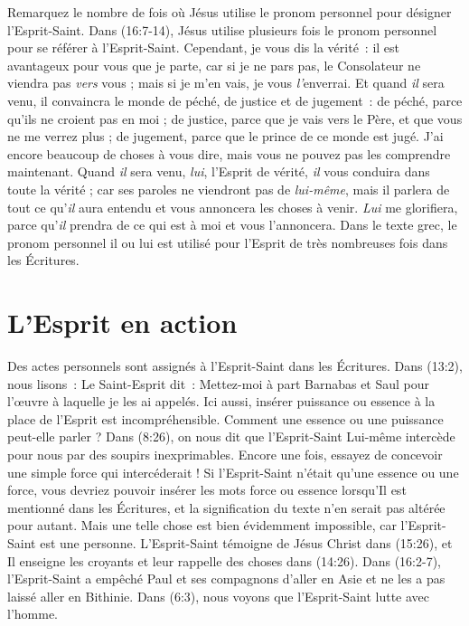 Remarquez le nombre de fois où Jésus utilise le pronom personnel pour
 désigner l'Esprit-Saint. Dans (16:7-14), Jésus utilise
 plusieurs fois le pronom personnel pour se référer à l'Esprit-Saint.
 \og Cependant, je vous dis la vérité~: il est avantageux pour vous
 que je parte, car si je ne pars pas, le Consolateur ne viendra pas
 \emph{vers} vous ; mais si je m'en vais, je vous \emph{l'}enverrai.
 Et quand \emph{il} sera venu, il convaincra le monde de péché,
 de justice et de jugement~: de péché, parce qu'ils ne croient pas en moi ;
 de justice, parce que je vais vers le Père, et que vous ne me verrez plus ;
 de jugement, parce que le prince de ce monde est jugé.
 J'ai encore beaucoup de choses à vous dire, mais vous ne pouvez pas
 les comprendre maintenant. Quand \emph{il} sera venu, \emph{lui},
 l'Esprit de vérité, \emph{il} vous conduira dans toute la vérité ;
 car ses paroles ne viendront pas de \emph{lui-même}, mais il parlera de
 tout ce qu'\emph{il} aura entendu et vous annoncera les choses à venir.
 \emph{Lui} me glorifiera, parce qu'\emph{il} prendra de ce qui est à moi
 et vous l'annoncera. \fg{}
 Dans le texte grec, le pronom personnel \og il \fg{} ou \og lui \fg{}
 est utilisé pour l'Esprit de très nombreuses fois dans les Écritures.

\section{L'Esprit en action}

Des actes personnels sont assignés à l'Esprit-Saint dans les
 Écritures. Dans (13:2), nous lisons~: \og Le Saint-Esprit dit~:
 Mettez-moi à part Barnabas et Saul pour l'œuvre à laquelle je les ai
 appelés. \fg{}
 Ici aussi, insérer \og puissance \fg{} ou \og essence \fg{} à la place
 de l'Esprit est incompréhensible. Comment une essence ou une puissance
 peut-elle parler ? Dans (8:26), on nous dit que l'Esprit-Saint
 Lui-même intercède pour nous par des soupirs inexprimables.
 Encore une fois, essayez de concevoir une simple force qui intercéderait !
 Si l'Esprit-Saint n'était qu'une essence ou une force, vous devriez pouvoir
 insérer les mots \og force \fg{} ou \og essence \fg{} lorsqu'Il est mentionné
 dans les Écritures, et la signification du texte n'en serait pas altérée pour
 autant. Mais une telle chose est bien évidemment impossible, car
 l'Esprit-Saint est une personne. L'Esprit-Saint témoigne de Jésus Christ dans
 (15:26), et Il enseigne les croyants et leur rappelle des choses
 dans (14:26). Dans (16:2-7), l'Esprit-Saint a
 empêché Paul et ses compagnons d'aller en Asie et ne les a pas laissé aller
 en Bithinie. Dans (6:3), nous voyons que l'Esprit-Saint lutte
 avec l'homme.

